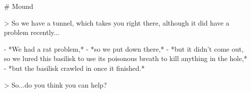 # Mound

> So we have a tunnel, which takes you right there, although it did have a problem recently...

- *We had a rat problem,*
- *so we put  down there,*
- *but it didn't come out, so we lured this basilisk to use its poisonous breath to kill anything in the hole,*
- *but the basilisk crawled in once it finished.*

> So...do you think you can help?
